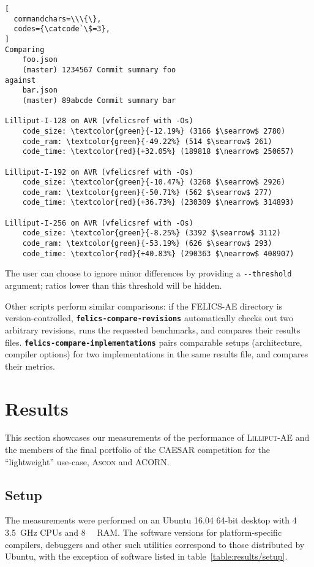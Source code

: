 \documentclass{article}
\begin{document}
\begin{Verbatim}[
  commandchars=\\\{\},
  codes={\catcode`\$=3},
]
Comparing
	foo.json
	(master) 1234567 Commit summary foo
against
	bar.json
	(master) 89abcde Commit summary bar

Lilliput-I-128 on AVR (vfelicsref with -Os)
	code_size: \textcolor{green}{-12.19%} (3166 $\searrow$ 2780)
	code_ram: \textcolor{green}{-49.22%} (514 $\searrow$ 261)
	code_time: \textcolor{red}{+32.05%} (189818 $\nearrow$ 250657)

Lilliput-I-192 on AVR (vfelicsref with -Os)
	code_size: \textcolor{green}{-10.47%} (3268 $\searrow$ 2926)
	code_ram: \textcolor{green}{-50.71%} (562 $\searrow$ 277)
	code_time: \textcolor{red}{+36.73%} (230309 $\nearrow$ 314893)

Lilliput-I-256 on AVR (vfelicsref with -Os)
	code_size: \textcolor{green}{-8.25%} (3392 $\searrow$ 3112)
	code_ram: \textcolor{green}{-53.19%} (626 $\searrow$ 293)
	code_time: \textcolor{red}{+40.83%} (290363 $\nearrow$ 408907)
\end{Verbatim}

The user can choose to ignore minor differences by providing a
\texttt{-{}-threshold} argument; ratios lower than this threshold will
be hidden.

Other scripts perform similar comparisons: if the FELICS-AE directory
is version-controlled, \textbf{\texttt{felics-compare-revisions}}
automatically checks out two arbitrary revisions, runs the requested
benchmarks, and compares their results files.
\textbf{\texttt{felics-compare-implementations}} pairs comparable
setups (architecture, compiler options) for two implementations in the
same results file, and compares their metrics.

\section{Results}
\label{sec:results}

This section showcases our measurements of the performance of
\textsc{Lilliput-AE} and the members of the final portfolio of the
CAESAR competition for the ``lightweight''
use-case\cite{CAESAR:submissions}, \textsc{Ascon} and ACORN.

\subsection{Setup}
\label{sec:results/setup}

The measurements were performed on an Ubuntu 16.04 64-bit desktop with
4 \SI{3.5}{\GHz} CPUs and \SI{8}{\giga \byte} RAM.  The software
versions for platform-specific compilers, debuggers and other such
utilities correspond to those distributed by Ubuntu, with the
exception of software listed in table~\ref{table:results/setup}.
\end{document}
